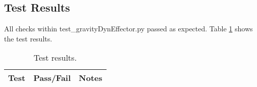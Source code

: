 \subsection{Test Results}

All checks within test\_gravityDynEffector.py passed as expected. Table \ref{tab:results} shows the test results.\\

\begin{table}[htbp]
	\caption{Test results.}
	\label{tab:results}
	\centering \fontsize{10}{10}\selectfont
	\begin{tabular}{c | c | c  } %
		\hline
		\textbf{Test} 				    & \textbf{Pass/Fail} 						   			           & \textbf{Notes} 									\\ \hline
	\end{tabular}
\end{table}